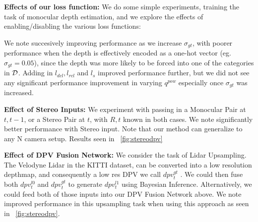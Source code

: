 \textbf{Effects of our loss function:} We do some simple experiments, training the task of monocular depth estimation, and we explore the effects of enabling/disabling the various loss functions:
\noindent
\begin{table}[h]
   \centering
   \caption{Effects of various loss functions for the baseline of Monocular Depth Estimation only}
   \label{table:xx}
\end{table}

We note succesively improving performance as we increase $\sigma_{gt}$, with poorer performance when the depth is effectively encoded as a one-hot vector (eg. $\sigma_{gt}=0.05$), since the depth was more likely to be forced into one of the categories in $\mathcal{D}$. Adding in $l_{dcl}, l_{rcl}$ and $l_{s}$ improved performance further, but we did not see any significant performance improvement in varying $q^{pow}$ especially once $\sigma_{gt}$ was increased.

\textbf{Effect of Stereo Inputs:} We experiment with passing in a Monocular Pair at $t, t-1$, or a Stereo Pair at $t$, with $R,t$ known in both cases. We note significantly better performance with Stereo input. Note that our method can generalize to any N camera setup. Results seen in ~\ref{fig:stereodpv}

\textbf{Effect of DPV Fusion Network:} We consider the task of Lidar Upsampling. The Velodyne Lidar in the KITTI dataset, can be converted into a low resolution depthmap, and consequently a low res DPV we call $dpv_{t}^{gt}$ . We could then fuse both $dpv_{t}^{l0}$ and $dpv_{t}^{gt}$ to generate $dpv_{t}^{l1}$ using Bayesian Inference. Alternatively, we could feed both of those inputs into our DPV Fusion Network above. We note improved performance in this upsampling task when using this approach as seen in ~\ref{fig:stereodpv}. 

